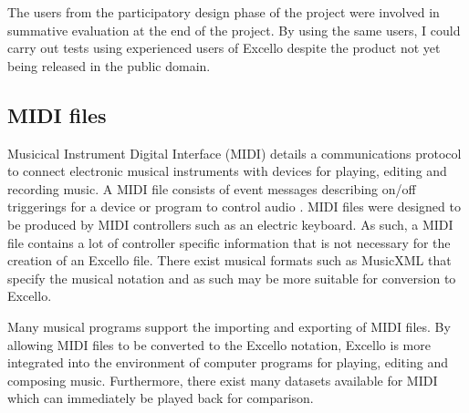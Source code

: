 \documentclass{article}
\begin{document}
The users from the participatory design phase of the project were involved in summative evaluation at the end of the project. By using the same users, I could carry out tests using experienced users of Excello despite the product not yet being released in the public domain.

\subsection{MIDI files}

Musicical Instrument Digital Interface (MIDI) details a communications protocol to connect electronic musical instruments with devices for playing, editing and recording music. A MIDI file consists of event messages describing on/off triggerings for a device or program to control audio \cite{huber:midimanual}. MIDI files were designed to be produced by MIDI controllers such as an electric keyboard. As such, a MIDI file contains a lot of controller specific information that is not necessary for the creation of an Excello file. There exist musical formats such as MusicXML that specify the musical notation and as such may be more suitable for conversion to Excello.

Many musical programs support the importing and exporting of MIDI files. By allowing MIDI files to be converted to the Excello notation, Excello is more integrated into the environment of computer programs for playing, editing and composing music. Furthermore, there exist many datasets available for MIDI \cite{huang:deep} which can immediately be played back for comparison.
\end{document}
